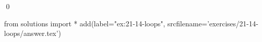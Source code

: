 
\begin{ex}
  \label{ex:21-14-loops}
  
  \qed
\end{ex}
\begin{python0}
from solutions import *
add(label="ex:21-14-loops",
    srcfilename='exercises/21-14-loops/answer.tex')
\end{python0}
